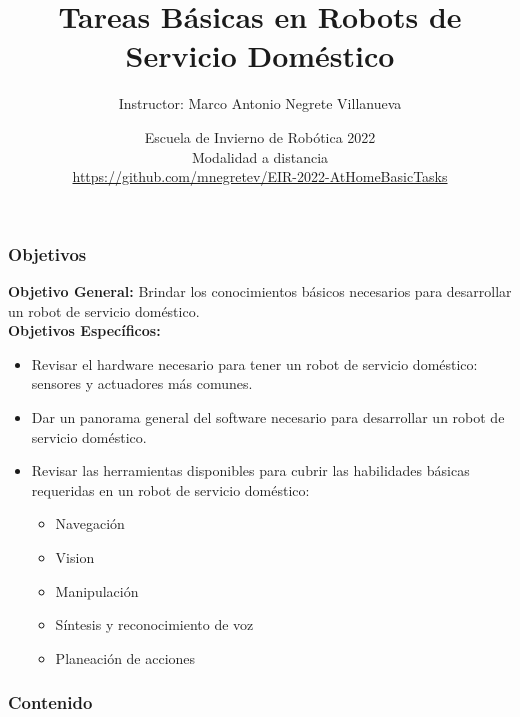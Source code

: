 \documentclass[10pt,spanish,aspectratio=1610]{beamer}
\begin{document}
\renewcommand{\tablename}{Tabla}
\renewcommand{\figurename}{Figura}

\title[Tareas Básicas en Robots de Servicio Doméstico]{Tareas Básicas en Robots de Servicio Doméstico}
\author[Marco Negrete]{Instructor: Marco Antonio Negrete Villanueva}
\date[EIR 2022]{Escuela de Invierno de Robótica 2022\\Modalidad a distancia\\\url{https://github.com/mnegretev/EIR-2022-AtHomeBasicTasks}}

\begin{frame}
\titlepage
\end{frame}

\begin{frame}\frametitle{Objetivos}
  \textbf{Objetivo General:} Brindar los conocimientos básicos necesarios para desarrollar un robot de servicio doméstico.
  \\
  \textbf{Objetivos Específicos:}
  \begin{itemize}
  \item Revisar el hardware necesario para tener un robot de servicio doméstico: sensores y actuadores más comunes.
  \item Dar un panorama general del software necesario para desarrollar un robot de servicio doméstico.
  \item Revisar las herramientas disponibles para cubrir las habilidades básicas requeridas en un robot de servicio doméstico:
    \begin{itemize}
    \item Navegación
    \item Vision
    \item Manipulación
    \item Síntesis y reconocimiento de voz
    \item Planeación de acciones
    \end{itemize}
  \end{itemize}
\end{frame}

\begin{frame}\frametitle{Contenido}
  \tableofcontents
\end{frame}











\end{document}
